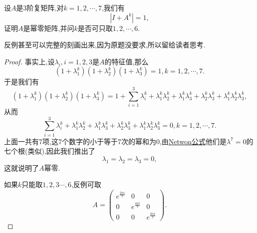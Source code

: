 \documentclass[../../main.tex]{subfiles}
\begin{document}
\begin{example}\label{example:例题028}
设\( A \)是3阶复矩阵,对\( k = 1,2,\cdots,7 \),我们有
\[
|I + A^k| = 1,
\]
证明\( A \)是幂零矩阵,并问\( k \)是否可只取\( 1,2,\cdots,6 \).
\end{example}
\begin{note}
反例甚至可以完整的刻画出来,因为原题没要求,所以留给读者思考.
\end{note}
\begin{proof}
事实上,设\( \lambda_i,i = 1,2,3 \)是\( A \)的特征值,那么
\[
(1 + \lambda_1^k)(1 + \lambda_2^k)(1 + \lambda_3^k) = 1,k = 1,2,\cdots,7.
\]
于是我们有
\[
(1 + \lambda_1^k)(1 + \lambda_2^k)(1 + \lambda_3^k) = 1 + \sum_{i = 1}^3 \lambda_i^k + \lambda_1^k\lambda_2^k + \lambda_1^k\lambda_3^k + \lambda_2^k\lambda_3^k + \lambda_1^k\lambda_2^k\lambda_3^k,
\]
从而
\[
\sum_{i = 1}^3 \lambda_i^k + \lambda_1^k\lambda_2^k + \lambda_1^k\lambda_3^k + \lambda_2^k\lambda_3^k + \lambda_1^k\lambda_2^k\lambda_3^k = 0,k = 1,2,\cdots,7.
\]
上面一共有7项,这7个数字的小于等于7次的幂和为0,由\hyperref[theorem:Netwon公式]{Netwon公式}他们是\( \lambda^7 = 0 \)的七个根(类似),因此我们推出了
\[
\lambda_1 = \lambda_2 = \lambda_3 = 0,
\]
这就说明了\( A \)幂零.

如果\( k \)只能取\( 1,2,3\cdots,6 \),反例可取
\[
A = \begin{pmatrix}
e^{\frac{2\pi i}{7}} & 0 & 0 \\
0 & e^{\frac{4\pi i}{7}} & 0 \\
0 & 0 & e^{\frac{8\pi i}{7}}
\end{pmatrix}.
\]
\end{proof}
\end{document}
